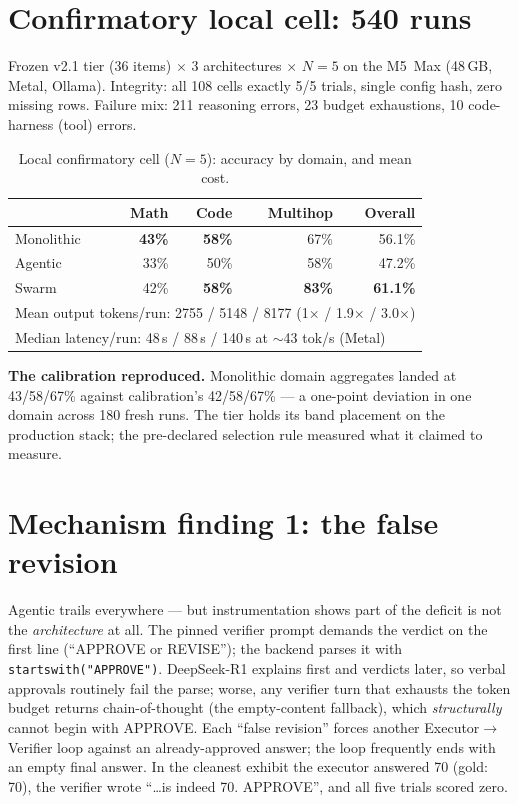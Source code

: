 \documentclass[sigconf,nonacm]{acmart}
\begin{document}
\section{Confirmatory local cell: 540 runs}
Frozen v2.1 tier (36 items) $\times$ 3 architectures $\times$ $N{=}5$ on the M5~Max
(48\,GB, Metal, Ollama). Integrity: all 108 cells exactly 5/5 trials, single config
hash, zero missing rows. Failure mix: 211 reasoning errors, 23 budget exhaustions,
10 code-harness (tool) errors.

\begin{table}[h]
\caption{Local confirmatory cell ($N{=}5$): accuracy by domain, and mean cost.}
\label{tab:n5}
\begin{tabular}{lrrrr}
\toprule
 & Math & Code & Multihop & \textbf{Overall}\\
\midrule
Monolithic & \textbf{43\%} & \textbf{58\%} & 67\% & 56.1\%\\
Agentic    & 33\% & 50\% & 58\% & 47.2\%\\
Swarm      & 42\% & \textbf{58\%} & \textbf{83\%} & \textbf{61.1\%}\\
\midrule
\multicolumn{5}{l}{\small Mean output tokens/run: 2755 / 5148 / 8177 (1$\times$ / 1.9$\times$ / 3.0$\times$)}\\
\multicolumn{5}{l}{\small Median latency/run: 48\,s / 88\,s / 140\,s at $\sim$43 tok/s (Metal)}\\
\bottomrule
\end{tabular}
\end{table}

\textbf{The calibration reproduced.} Monolithic domain aggregates landed at
43/58/67\% against calibration's 42/58/67\% --- a one-point deviation in one domain
across 180 fresh runs. The tier holds its band placement on the production stack; the
pre-declared selection rule measured what it claimed to measure.

\section{Mechanism finding 1: the false revision}
Agentic trails everywhere --- but instrumentation shows part of the deficit is not the
\emph{architecture} at all. The pinned verifier prompt demands the verdict on the first
line (``APPROVE or REVISE''); the backend parses it with
\texttt{startswith("APPROVE")}. DeepSeek-R1 explains first and verdicts later, so
verbal approvals routinely fail the parse; worse, any verifier turn that exhausts the
token budget returns chain-of-thought (the empty-content fallback), which
\emph{structurally} cannot begin with APPROVE. Each ``false revision'' forces another
Executor$\to$Verifier loop against an already-approved answer; the loop frequently
ends with an empty final answer. In the cleanest exhibit the executor answered 70
(gold: 70), the verifier wrote ``\ldots is indeed 70. APPROVE'', and all five trials
scored zero.
\end{document}
